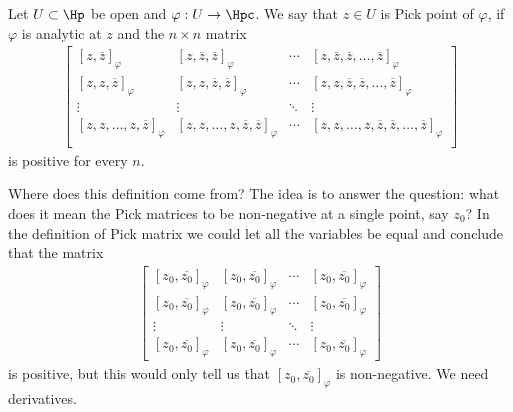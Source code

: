 \begin{maar}
	Let $U \subset \Hp$ be open and $\varphi : U \to \Hpc$. We say that $z \in U$ is Pick point of $\varphi$, if $\varphi$ is analytic at $z$ and the $n \times n$ matrix
	\begin{align*}
	\begin{bmatrix}
		[z, \overline{z}]_{\varphi} & [z, \overline{z}, \overline{z} ]_{\varphi} & \cdots & [z, \overline{z}, \overline{z}, \ldots, \overline{z}]_{\varphi} \\
		[z, z, \overline{z}]_{\varphi} & [z, z, \overline{z}, \overline{z} ]_{\varphi} & \cdots & [z, z, \overline{z}, \overline{z}, \ldots, \overline{z}]_{\varphi} \\
		\vdots & \vdots & \ddots & \vdots \\
		[z, z, \ldots, z, \overline{z}]_{\varphi} & [z, z, \ldots, z, \overline{z}, \overline{z} ]_{\varphi} & \cdots & [z, z, \ldots, z, \overline{z}, \overline{z}, \ldots, \overline{z}]_{\varphi} \\
	\end{bmatrix}
	\end{align*}
	is positive for every $n$.
\end{maar}

Where does this definition come from? The idea is to answer the question: what does it mean the Pick matrices to be non-negative at a single point, say $z_{0}$? In the definition of Pick matrix we could let all the variables be equal and conclude that the matrix
\begin{align*}
\begin{bmatrix}
	[z_{0}, \overline{z_{0}}]_{\varphi} & [z_{0}, \overline{z_{0}}]_{\varphi} & \cdots & [z_{0}, \overline{z_{0}}]_{\varphi} \\
	[z_{0}, \overline{z_{0}}]_{\varphi} & [z_{0}, \overline{z_{0}}]_{\varphi} & \cdots & [z_{0}, \overline{z_{0}}]_{\varphi} \\
	\vdots & \vdots & \ddots & \vdots \\
	[z_{0}, \overline{z_{0}}]_{\varphi} & [z_{0}, \overline{z_{0}}]_{\varphi} & \cdots &  [z_{0}, \overline{z_{0}}]_{\varphi}
\end{bmatrix}
\end{align*}
is positive, but this would only tell us that $[z_{0}, \overline{z_{0}}]_{\varphi}$ is non-negative. We need derivatives.

